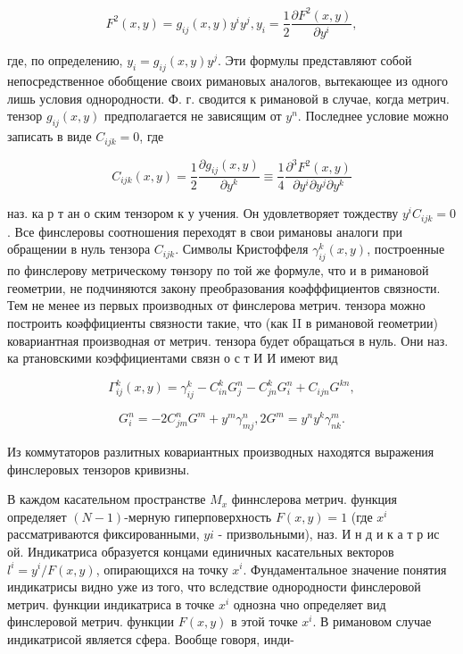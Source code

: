 \documentclass[10pt]{article}
\begin{document}
\[

F^{2}(x, y)=g_{i j}(x, y) y^{i} y^{j}, y_{i}=\frac{1}{2} \frac{\partial F^{2}(x, y)}{\partial y^{i}},

\]



где, по определению, $y_{i}=g_{i j}(x, y) y^{j}$. Эти формулы представляют собой непосредственное обобщение своих римановых аналогов, вытекающее из одного лишь условия однородности. Ф. г. сводится к римановой в случае, когда метрич. тензор $g_{i j}(x, y)$ предполагается не зависящим от $y^{n}$. Последнее условие можно записать в виде $C_{i j k}=0$, где



\[

C_{i j k}(x, y)=\frac{1}{2} \frac{\partial g_{i j}(x, y)}{\partial y^{k}} \equiv \frac{1}{4} \frac{\partial^{3} F^{2}(x, y)}{\partial y^{i} \partial y^{j} \partial y^{k}}

\]



наз. ка р т ан о ским тензором к у учения. Он удовлетворяет тождеству $y^{i} C_{i j k}=0$. Все финслеровы соотношения переходят в свои римановы аналоги при обращении в нуль тензора $C_{i j k}$. Символы Кристоффеля $\gamma_{i j}^{k}(x, y)$, построенные по финслерову метрическому төнзору по той же формуле, что и в римановой геометрии, не подчиняются закону преобразования коәфффициентов связности. Тем не менее из первых производных от финслерова метрич. тензора можно построить коәффициенты связности такие, что (как II в римановой геометрии) ковариантная производная от метрич. тензора будет обращаться в нуль. Они наз. ка ртановскими коэффициентами связн о с т И И имеют вид



\[

\Gamma_{i j}^{k}(x, y)=\gamma_{i j}^{k}-C_{i n}^{k} G_{j}^{n}-C_{j n}^{k} G_{i}^{n}+C_{i j n} G^{k n},

\]



\[

G_{i}^{n}=-2 C_{j m}^{n} G^{m}+y^{m} \gamma_{m j}^{n}, 2 G^{m}=y^{n} y^{k} \gamma_{n k}^{m} .

\]



Из коммутаторов разлитных ковариантных производных находятся выражения финслеровых тензоров кривизны.



В каждом касательном пространстве $M_{x}$ финнслерова метрич. функция определяет $(N-1)$-мерную гиперповерхность $F(x, y)=1$ (где $x^{i}$ рассматриваются фиксированными, $y i$ - призвольными), наз. И н д и к а т р ис ой. Индикатриса образуется концами единичных касательных векторов $l^{i}=y^{i} / F(x, y)$, опирающихся на точку $x^{i}$. Фундаментальное значение понятия индикатрисы видно уже из того, что вследствие однородности финслеровой метрич. функции индикатриса в точке $x^{i}$ однозна чно определяет вид финслеровой метрич. функции $F(x, y)$ в этой точке $x^{i}$. В римановом случае индикатрисой является сфера. Вообще говоря, инди-
\end{document}
